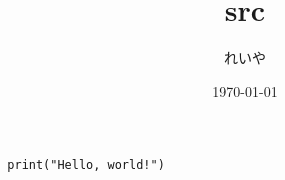 \documentclass[a4paper,11pt]{jsarticle}
\begin{document}
\title{src}
\author{れいや}
\date{\today}
\maketitle

\begin{lstlisting}
  print("Hello, world!")
\end{lstlisting}
\end{document}
